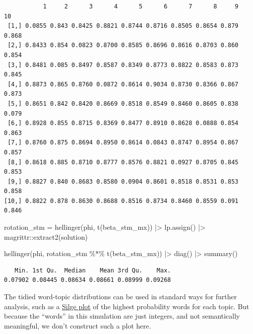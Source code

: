 \documentclass[
]{article}
\newenvironment{Shaded}{\begin{snugshade}}{\end{snugshade}}
\newcommand{\FunctionTok}[1]{\textcolor[rgb]{0.28,0.35,0.67}{#1}}
\newcommand{\NormalTok}[1]{\textcolor[rgb]{0.00,0.23,0.31}{#1}}
\newcommand{\OtherTok}[1]{\textcolor[rgb]{0.00,0.23,0.31}{#1}}
\newcommand{\SpecialCharTok}[1]{\textcolor[rgb]{0.37,0.37,0.37}{#1}}
\newcommand{\StringTok}[1]{\textcolor[rgb]{0.13,0.47,0.30}{#1}}
\begin{document}
\begin{verbatim}
           1     2      3      4      5      6      7      8     9    10
 [1,] 0.0855 0.843 0.8425 0.8821 0.8744 0.8716 0.8505 0.8654 0.879 0.868
 [2,] 0.8433 0.854 0.0823 0.8700 0.8585 0.8696 0.8616 0.8703 0.860 0.854
 [3,] 0.8481 0.085 0.8497 0.8587 0.8349 0.8773 0.8822 0.8583 0.873 0.845
 [4,] 0.8873 0.865 0.8760 0.0872 0.8614 0.9034 0.8730 0.8366 0.867 0.873
 [5,] 0.8651 0.842 0.8420 0.8669 0.8518 0.8549 0.8460 0.8605 0.838 0.079
 [6,] 0.8928 0.855 0.8715 0.8369 0.8477 0.8910 0.8628 0.0888 0.854 0.863
 [7,] 0.8760 0.875 0.8694 0.8950 0.8614 0.0843 0.8747 0.8954 0.867 0.857
 [8,] 0.8618 0.885 0.8710 0.8777 0.8576 0.8821 0.0927 0.8705 0.845 0.853
 [9,] 0.8827 0.840 0.8683 0.8580 0.0904 0.8601 0.8518 0.8531 0.853 0.858
[10,] 0.8822 0.878 0.8630 0.8688 0.8516 0.8734 0.8460 0.8559 0.091 0.846
\end{verbatim}

\begin{Shaded}
\begin{Highlighting}[]
\NormalTok{rotation\_stm }\OtherTok{=} \FunctionTok{hellinger}\NormalTok{(phi, }\FunctionTok{t}\NormalTok{(beta\_stm\_mx)) }\SpecialCharTok{|\textgreater{}} 
    \FunctionTok{lp.assign}\NormalTok{() }\SpecialCharTok{|\textgreater{}} 
\NormalTok{    magrittr}\SpecialCharTok{::}\FunctionTok{extract2}\NormalTok{(}\StringTok{\textquotesingle{}solution\textquotesingle{}}\NormalTok{)}

\FunctionTok{hellinger}\NormalTok{(phi, rotation\_stm }\SpecialCharTok{\%*\%} \FunctionTok{t}\NormalTok{(beta\_stm\_mx)) }\SpecialCharTok{|\textgreater{}}
    \FunctionTok{diag}\NormalTok{() }\SpecialCharTok{|\textgreater{}}
    \FunctionTok{summary}\NormalTok{()}
\end{Highlighting}
\end{Shaded}

\begin{verbatim}
   Min. 1st Qu.  Median    Mean 3rd Qu.    Max. 
0.07902 0.08445 0.08634 0.08661 0.08999 0.09268 
\end{verbatim}

The tidied word-topic distributions can be used in standard ways for
further analysis, such as a
\href{https://juliasilge.com/blog/2018/2018-01-25-sherlock-holmes-stm_files/figure-html/unnamed-chunk-6-1.png}{Silge
plot} of the highest probability words for each topic. But because the
``words'' in this simulation are just integers, and not semantically
meaningful, we don't construct such a plot here.
\end{document}

